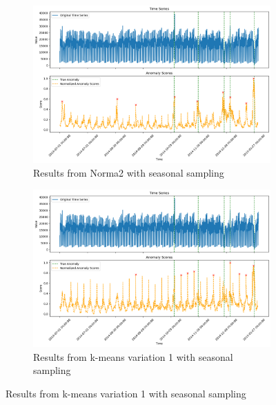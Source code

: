 \documentclass[11pt]{article}
\begin{document}
\begin{figure}[h]
    \begin{subfigure}[b]{0.4\textwidth}
        \includegraphics[width=\textwidth]{algo2.png}
        \caption{Results from Norma2 with seasonal sampling}
        \label{fig:algo2}
    \end{subfigure}

    \begin{subfigure}[b]{0.4\textwidth}
        \includegraphics[width=\textwidth]{algo3.png}
        \caption{Results from k-means variation 1 with seasonal sampling}
        \label{fig:algo3}
    \end{subfigure}


\end{figure}
\end{document}
